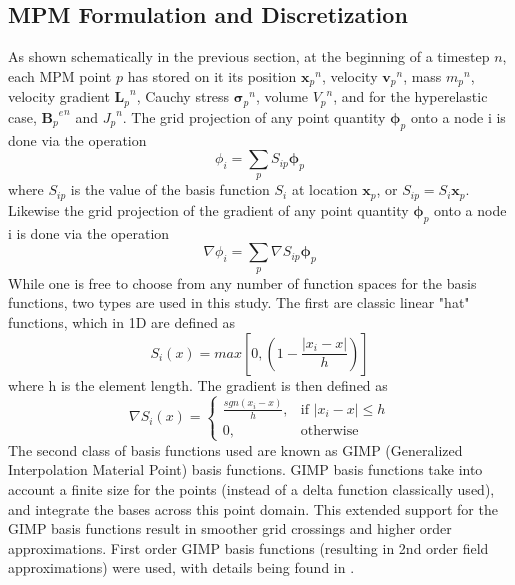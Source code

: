\subsection{MPM Formulation and Discretization}
As shown schematically in the previous section, at the beginning of a timestep $n$, each MPM point $p$ has stored on it its position ${\bm{x}_p}^n$, velocity ${\bm{v}_p}^n$, mass ${m_p}^n$, velocity gradient ${\bm{L}_p}^n$, Cauchy stress ${\bm{\sigma}_p}^n$, volume ${V_p}^n$, and for the hyperelastic case, ${{\bm{B}_p}^e}^n$ and ${J_p}^n$. The grid projection of any point quantity $\bm{\phi}_p$ onto a node i is done via the operation
\begin{equation}
\phi_i=\sum_pS_{ip}{\bm{\phi}}_p\label{projection_value}
\end{equation}
where $S_{ip}$ is the value of the basis function $S_i$ at location $\bm{x}_p$, or $S_{ip}=S_i{\bm{x}_p}$. Likewise the grid projection of the gradient of any point quantity $\bm{\phi}_p$ onto a node i is done via the operation
\begin{equation}
\nabla \phi_i=\sum_p \nabla S_{ip}{\bm{\phi}}_p \label{projection_gradient}
\end{equation}
While one is free to choose from any number of function spaces for the basis functions, two types are used in this study. The first are classic linear "hat" functions, which in 1D are defined as
\begin{equation}
S_i(x)=max[0,(1-\frac{|x_i-x|}{h})]\label{linear_basis}
\end{equation}
where h is the element length. The gradient is then defined as
\begin{equation}
	\nabla S_i(x)=
\begin{cases}
	\frac{sgn(x_i-x)}{h},     & \text{if } |x_i-x| \leq h \\
	0,						 & \text{otherwise}
\end{cases}
\label{linear_basis_gradient}
\end{equation}
The second class of basis functions used are known as GIMP (Generalized Interpolation Material Point) basis functions. GIMP basis functions take into account a finite size for the points (instead of a delta function classically used), and integrate the bases across this point domain. This extended support for the GIMP basis functions result in smoother grid crossings and higher order approximations. First order GIMP basis functions (resulting in 2nd order field approximations) were used, with details being found in \cite{Bardenhagen:2004}.

